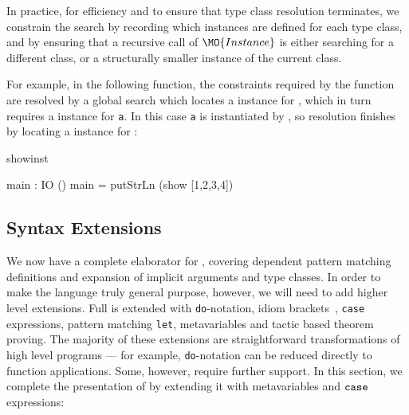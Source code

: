
In practice, for efficiency and to ensure that type class resolution terminates,
we constrain the search by recording which instances are defined for each type class,
and by ensuring that a recursive call of $\MO{Instance}$ is either searching for
a different class, or a structurally smaller instance of the current class. 

For example, in the following function, the constraints required by the
 function are resolved by a global search which locates a 
instance for , which in turn requires a  instance for
\texttt{a}.  In this case \texttt{a} is instantiated by , so resolution finishes
by locating a  instance for :

\begin{SaveVerbatim}{showinst}

main : IO ()
main = putStrLn (show [1,2,3,4]) 

\end{SaveVerbatim}

\subsection{Syntax Extensions}

We now have a complete elaborator for \IdrisM{}, covering 
dependent pattern matching definitions and expansion of implicit arguments
and type classes. In order to make the language truly general purpose, however, we
will need to add higher level extensions. Full \Idris{} is \IdrisM{} extended
with \texttt{do}-notation, idiom brackets~\cite{McBride2007}, \texttt{case} expressions,
pattern matching \texttt{let}, metavariables and tactic based theorem proving.
The majority of these extensions are straightforward transformations of high level
\Idris{} programs --- for example, \texttt{do}-notation can be reduced directly to
\IdrisM{} function applications. Some, however, require further support. In this section,
we complete the presentation of \IdrisM{} by extending it with metavariables
and $\mathtt{case}$ expressions:


